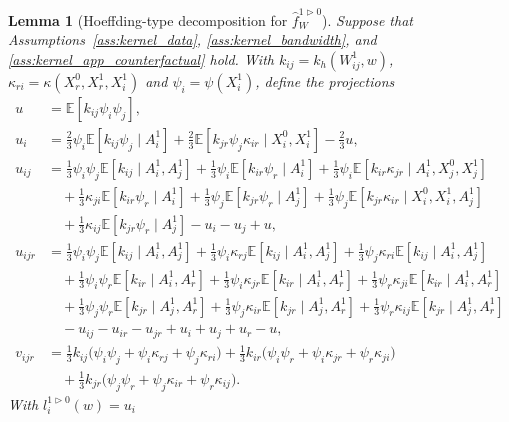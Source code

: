 \documentclass[11pt,lof]{puthesis}
\newcommand{\E}{\ensuremath{\mathbb{E}}}
\theoremstyle{break}
\newtheorem{lemma}{Lemma}[section]
\theoremstyle{proof}
\begin{document}
\begin{lemma}[Hoeffding-type decomposition for
$\hat f_W^{1 \triangleright 0}$]
Suppose that Assumptions~\ref{ass:kernel_data},
\ref{ass:kernel_bandwidth}, and
\ref{ass:kernel_app_counterfactual} hold.
With $k_{i j} = k_h(W_{i j}^1, w)$,
$\kappa_{r i} = \kappa(X_r^0, X_r^1, X_i^1)$
and $\psi_i = \psi(X_i^1)$, define the projections
%
\begin{align*}
u
&=
\E\left[
k_{i j}
\psi_i
\psi_j
\right], \\
u_i
&=
\frac{2}{3} \psi_i
\E\left[
k_{i j}
\psi_j
\mid A_i^1 \right]
+
\frac{2}{3} \E\left[
k_{jr}
\psi_j \kappa_{i r}
\mid X_i^0, X_i^1 \right]
- \frac{2}{3} u, \\
u_{i j}
&=
\frac{1}{3}
\psi_i
\psi_j
\E\left[
k_{i j}
\mid A_i^1, A_j^1 \right]
+
\frac{1}{3}
\psi_i
\E\left[
k_{i r} \psi_r
\mid A_i^1 \right]
+
\frac{1}{3}
\psi_i
\E\left[
k_{i r} \kappa_{jr}
\mid A_i^1, X_j^0, X_j^1 \right] \\
&\quad+
\frac{1}{3}
\kappa_{j i}
\E\left[
k_{i r} \psi_r
\mid A_i^1 \right]
+ \frac{1}{3}
\psi_j
\E\left[
k_{jr} \psi_r
\mid A_j^1 \right]
+
\frac{1}{3}
\psi_j
\E\left[
k_{jr} \kappa_{i r}
\mid X_i^0, X_i^1, A_j^1 \right] \\
&\quad+
\frac{1}{3}
\kappa_{i j}
\E\left[
k_{jr} \psi_r
\mid A_j^1 \right]
- u_i - u_j + u, \\
u_{i j r}
&=
\frac{1}{3}
\psi_i \psi_j
\E\left[
k_{i j}
\mid A_i^1, A_j^1 \right]
+
\frac{1}{3}
\psi_i \kappa_{r j}
\E\left[
k_{i j}
\mid A_i^1, A_j^1 \right]
+
\frac{1}{3}
\psi_j \kappa_{r i}
\E\left[
k_{i j}
\mid A_i^1, A_j^1 \right] \\
&\quad+
\frac{1}{3}
\psi_i \psi_r
\E\left[
k_{i r}
\mid A_i^1, A_r^1 \right]
+ \frac{1}{3}
\psi_i \kappa_{jr}
\E\left[
k_{i r}
\mid A_i^1, A_r^1 \right]
+
\frac{1}{3}
\psi_r \kappa_{j i}
\E\left[
k_{i r}
\mid A_i^1, A_r^1 \right] \\
&\quad+
\frac{1}{3}
\psi_j \psi_r
\E\left[
k_{jr}
\mid A_j^1, A_r^1 \right]
+ \frac{1}{3}
\psi_j \kappa_{i r}
\E\left[
k_{jr}
\mid A_j^1, A_r^1 \right]
+
\frac{1}{3}
\psi_r \kappa_{i j}
\E\left[
k_{jr}
\mid A_j^1, A_r^1 \right] \\
&\quad-
u_{i j} - u_{i r} - u_{jr}
+ u_i + u_j + u_r
- u, \\
v_{i j r}
&=
\frac{1}{3}
k_{i j} \big(\psi_i \psi_j +\psi_i \kappa_{r j} +\psi_j \kappa_{r i} \big)
+ \frac{1}{3}
k_{i r} \big(\psi_i \psi_r +\psi_i \kappa_{jr} +\psi_r \kappa_{j i} \big) \\
&\quad+
\frac{1}{3}
k_{jr} \big(\psi_j \psi_r +\psi_j \kappa_{i r} +\psi_r \kappa_{i j} \big).
\end{align*}
%
With $l_i^{1 \triangleright 0}(w) = u_i$

\end{lemma}
\end{document}
